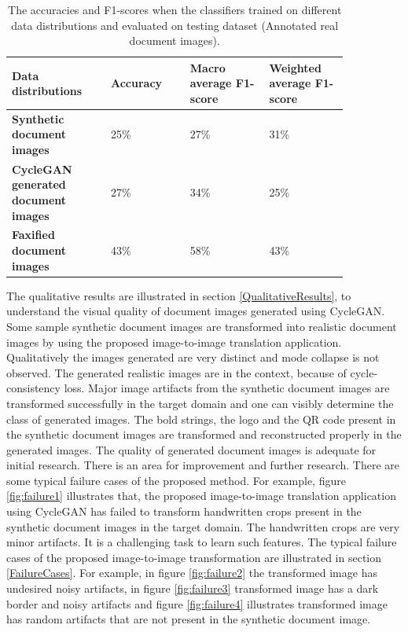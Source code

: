 \begin{table}[H]
\begin{tabular}{P{0.25\linewidth} P{0.20\linewidth} P{0.20\linewidth} P{0.20\linewidth}} 
	\toprule
	\bf{Data distributions} & \bf{Accuracy}  & \bf{Macro average F1-score} & \bf{Weighted average F1-score}\\[0.0ex] 
	\midrule
     \bf{Synthetic document images} & 25\% & 27\% & 31\%\\[0.0ex]
     \midrule
     \bf{\ac{CycleGAN} generated document images} & 27\% & 34\% & 25\%\\[0.0ex]
     \midrule
     \bf{Faxified document images} & 43\% & 58\% & 43\%\\[0.0ex]
     \bottomrule
\end{tabular}
 \caption[The accuracies and F1-scores when the classifiers trained on different data distributions and evaluated on testing dataset (Annotated real document images).]{The accuracies and F1-scores when the classifiers trained on different data distributions and evaluated on testing dataset (Annotated real document images).}
    \label{table:finalResults}
\end{table}



The qualitative results are illustrated in section \ref{QualitativeResults}, to understand the visual quality of document images generated using \ac{CycleGAN}. Some sample synthetic document images are transformed into realistic document images by using the proposed image-to-image translation application. Qualitatively the images generated are very distinct and mode collapse \cite{thanhtung2020catastrophic} is not observed. The generated realistic images are in the context, because of cycle-consistency loss. Major image artifacts from the synthetic document images are transformed successfully in the target domain and one can visibly determine the class of generated images. The bold strings, the logo and the QR code present in the synthetic document images are transformed and reconstructed properly in the generated images. The quality of generated document images is adequate for initial research. There is an area for improvement and further research. There are some typical failure cases of the proposed method. For example, figure \ref{fig:failure1} illustrates that, the proposed image-to-image translation application using \ac{CycleGAN} has failed to transform handwritten crops present in the synthetic document images in the target domain. The handwritten crops are very minor artifacts. It is a challenging task to learn such features. The typical failure cases of the proposed image-to-image transformation are illustrated in section \ref{FailureCases}. For example, in figure \ref{fig:failure2} the transformed image has undesired noisy artifacts, in figure \ref{fig:failure3} transformed image has a dark border and noisy artifacts and figure \ref{fig:failure4} illustrates transformed image has random artifacts that are not present in the synthetic document image. 



